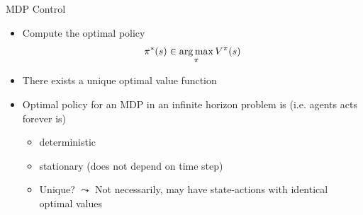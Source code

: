 \begin{frame}[c]{MDP Control}

\begin{itemize}
	\item Compute the optimal policy
	$$ \pi^*(s)  \in \operatorname*{arg\,max}_\pi V^\pi(s)$$
	\item There \alert{exists a unique optimal value function}
	\item Optimal policy for an MDP in an infinite horizon problem is \newline (i.e. agents acts forever is)
	\begin{itemize}
		\item  deterministic
		\item stationary (does not depend on time step)
		\item Unique? $\leadsto$ Not necessarily, may have state-actions with identical optimal values
	\end{itemize}
\end{itemize}

\end{frame}



